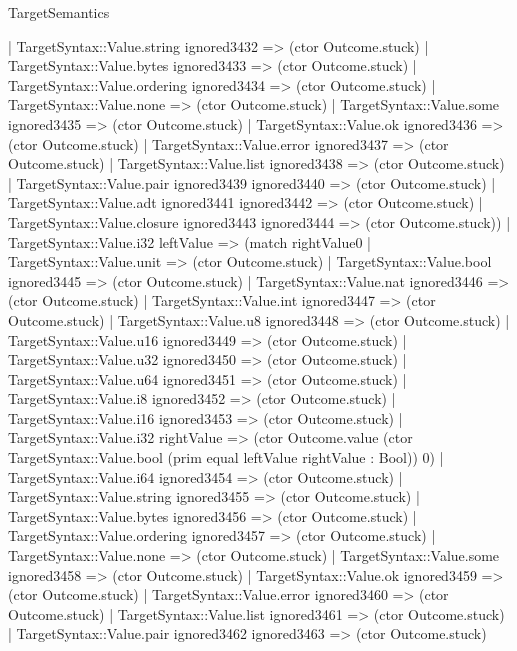 \begin{lexlean}{TargetSemantics}
\begin{semanticmodule}
{              | TargetSyntax::Value.string ignored3432 => (ctor Outcome.stuck)
              | TargetSyntax::Value.bytes ignored3433 => (ctor Outcome.stuck)
              | TargetSyntax::Value.ordering ignored3434 => (ctor Outcome.stuck)
              | TargetSyntax::Value.none => (ctor Outcome.stuck)
              | TargetSyntax::Value.some ignored3435 => (ctor Outcome.stuck)
              | TargetSyntax::Value.ok ignored3436 => (ctor Outcome.stuck)
              | TargetSyntax::Value.error ignored3437 => (ctor Outcome.stuck)
              | TargetSyntax::Value.list ignored3438 => (ctor Outcome.stuck)
              | TargetSyntax::Value.pair ignored3439 ignored3440 => (ctor Outcome.stuck)
              | TargetSyntax::Value.adt ignored3441 ignored3442 => (ctor Outcome.stuck)
              | TargetSyntax::Value.closure ignored3443 ignored3444 => (ctor Outcome.stuck))
            | TargetSyntax::Value.i32 leftValue => (match rightValue0
              | TargetSyntax::Value.unit => (ctor Outcome.stuck)
              | TargetSyntax::Value.bool ignored3445 => (ctor Outcome.stuck)
              | TargetSyntax::Value.nat ignored3446 => (ctor Outcome.stuck)
              | TargetSyntax::Value.int ignored3447 => (ctor Outcome.stuck)
              | TargetSyntax::Value.u8 ignored3448 => (ctor Outcome.stuck)
              | TargetSyntax::Value.u16 ignored3449 => (ctor Outcome.stuck)
              | TargetSyntax::Value.u32 ignored3450 => (ctor Outcome.stuck)
              | TargetSyntax::Value.u64 ignored3451 => (ctor Outcome.stuck)
              | TargetSyntax::Value.i8 ignored3452 => (ctor Outcome.stuck)
              | TargetSyntax::Value.i16 ignored3453 => (ctor Outcome.stuck)
              | TargetSyntax::Value.i32 rightValue => (ctor Outcome.value (ctor TargetSyntax::Value.bool (prim equal leftValue rightValue : Bool)) 0)
              | TargetSyntax::Value.i64 ignored3454 => (ctor Outcome.stuck)
              | TargetSyntax::Value.string ignored3455 => (ctor Outcome.stuck)
              | TargetSyntax::Value.bytes ignored3456 => (ctor Outcome.stuck)
              | TargetSyntax::Value.ordering ignored3457 => (ctor Outcome.stuck)
              | TargetSyntax::Value.none => (ctor Outcome.stuck)
              | TargetSyntax::Value.some ignored3458 => (ctor Outcome.stuck)
              | TargetSyntax::Value.ok ignored3459 => (ctor Outcome.stuck)
              | TargetSyntax::Value.error ignored3460 => (ctor Outcome.stuck)
              | TargetSyntax::Value.list ignored3461 => (ctor Outcome.stuck)
              | TargetSyntax::Value.pair ignored3462 ignored3463 => (ctor Outcome.stuck)
}
\end{semanticmodule}
\end{lexlean}

